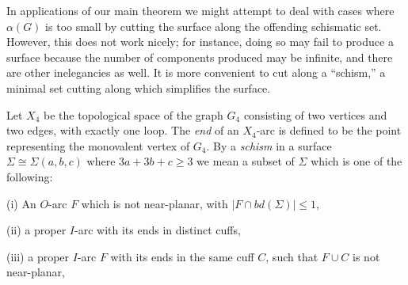 In applications of our main theorem we might attempt to deal with cases where $\alpha(G)$ is too small by cutting the surface along the offending schismatic set. However, this does not work nicely; for instance, doing so may fail to produce a surface because the number of components produced may be infinite, and there are other inelegancies as well. It is more convenient to cut along a ``schism,'' a minimal set cutting along which simplifies the surface.

Let $X_4$ be the topological space of the graph $G_4$ consisting of two vertices and two edges, with exactly one loop. The \textit{end} of an $X_4$-arc is defined to be the point representing the monovalent vertex of $G_4$. By a \textit{schism} in a surface $\Sigma \cong \Sigma(a, b, c)$ where $3a + 3b + c \ge 3$ we mean a subset of $\Sigma$ which is one of the following:

\hspace*{12pt}(i) An $O$-arc $F$ which is not near-planar, with $|F \cap bd(\Sigma)| \le 1$,

\hspace*{12pt}(ii) a proper $I$-arc with its ends in distinct cuffs,

\hspace*{12pt}(iii) a proper $I$-arc $F$ with its ends in the same cuff $C$, such that $F \cup C$ is not near-planar,
